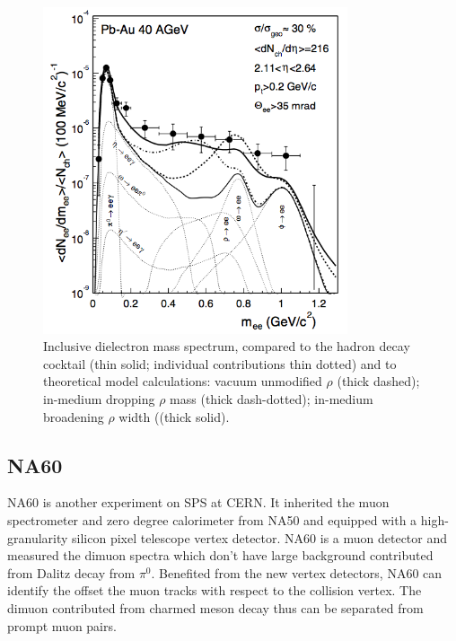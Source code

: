\begin{figure}
\begin{centering}
\includegraphics[width=0.8\textwidth]{fig/1.Introduction/NA45_Pb_Au_40AGeV}
\par\end{centering}

\protect\caption{Inclusive dielectron mass spectrum, compared to the hadron decay cocktail
(thin solid; individual contributions thin dotted) and to theoretical
model calculations: vacuum unmodified $\rho$ (thick dashed); in-medium
dropping $\rho$ mass (thick dash-dotted); in-medium broadening $\rho$
width ((thick solid). \cite{PhysRevLett.91.042301}}


\label{fig:NA45_Pb_Au}
\end{figure}



\subsection{NA60}

NA60 is another experiment on SPS at CERN. It inherited the muon spectrometer
and zero degree calorimeter from NA50 and equipped with a high-granularity
silicon pixel telescope vertex detector. NA60 is a muon detector and
measured the dimuon spectra which don't have large background contributed
from Dalitz decay from $\pi^{0}$. Benefited from the new vertex detectors,
NA60 can identify the offset the muon tracks with respect to the collision
vertex. The dimuon contributed from charmed meson decay thus can be
separated from prompt muon pairs.

